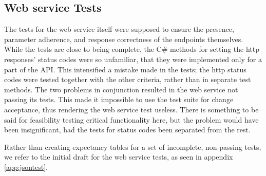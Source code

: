 \subsection{Web service Tests}
The tests for the web service itself were supposed to ensure the presence,
parameter adherence, and response correctness of the endpoints themselves.
While the tests are close to being complete, the C\# methods for setting the
http responses' status codes were so unfamiliar, that they were implemented only
for a part of the API. This intensified a mistake made in the tests; the http
status codes were tested together with the other criteria, rather than in
separate test methods. The two problems in conjunction resulted in the web
service not passing its tests. This made it impossible to use the test suite for
change acceptance, thus rendering the web service test useless. There is
something to be said for feasibility testing critical functionality here, but
the problem would have been insignificant, had the tests for status codes been
separated from the rest.

Rather than creating expectancy tables for a set of incomplete, non-passing
tests, we refer to the initial draft for the web service tests, as seen in
appendix \ref{app:jsontest}.
